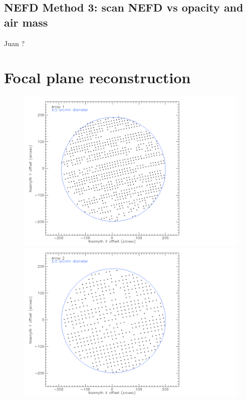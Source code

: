 \documentclass[a4paper, 11pt]{article} %
\begin{document}
\subsection{NEFD Method 3: scan NEFD vs opacity and air mass}
Juan ?

\section{Focal plane reconstruction}
\label{se:fov}

\begin{figure}
\begin{center}
\includegraphics[clip, angle=0, scale = 0.15]{Figures/FOV_A1.png}
\includegraphics[clip, angle=0, scale = 0.15]{Figures/FOV_A2.png}

\end{center}
\end{figure}
\end{document}
